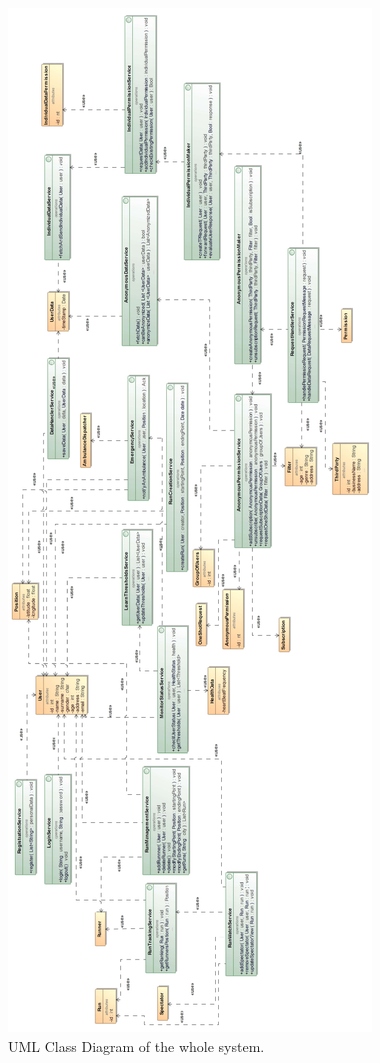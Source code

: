\documentclass[a4paper]{article}
\begin{document}
\begin{figure}[H]
    \centering
    \includegraphics[width=\linewidth, height=\textheight]{ClassDiagramTotal}
    \caption{UML Class Diagram of the whole system.}
    \label{fig:my_label}
\end{figure}
\clearpage
\end{document}
